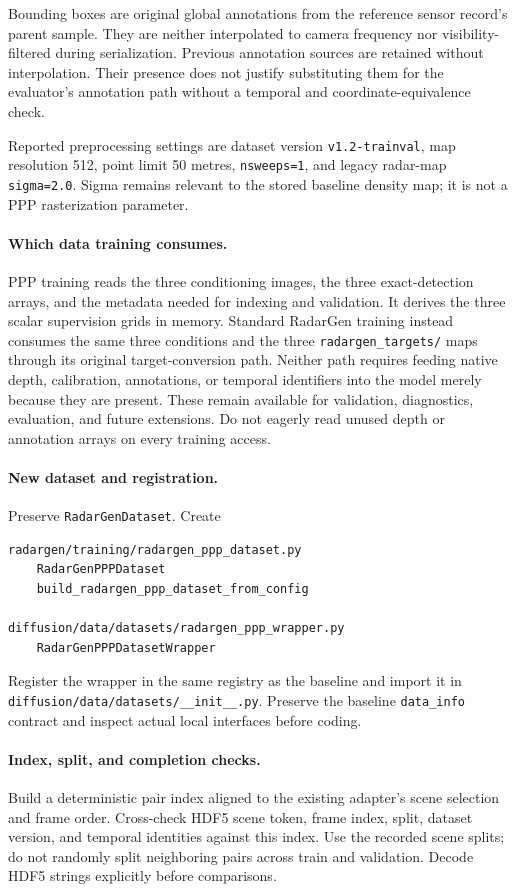 \documentclass[11pt,a4paper]{article}
\begin{document}
Bounding boxes are original global annotations from the reference sensor record's parent sample. They are neither interpolated to camera frequency nor visibility-filtered during serialization. Previous annotation sources are retained without interpolation. Their presence does not justify substituting them for the evaluator's annotation path without a temporal and coordinate-equivalence check.

Reported preprocessing settings are dataset version \texttt{v1.2-trainval}, map resolution 512, point limit 50 metres, \texttt{nsweeps=1}, and legacy radar-map \texttt{sigma=2.0}. Sigma remains relevant to the stored baseline density map; it is not a PPP rasterization parameter.

\paragraph{Which data training consumes.}
PPP training reads the three conditioning images, the three exact-detection arrays, and the metadata needed for indexing and validation. It derives the three scalar supervision grids in memory. Standard RadarGen training instead consumes the same three conditions and the three \texttt{radargen\_targets/} maps through its original target-conversion path. Neither path requires feeding native depth, calibration, annotations, or temporal identifiers into the model merely because they are present. These remain available for validation, diagnostics, evaluation, and future extensions. Do not eagerly read unused depth or annotation arrays on every training access.

\paragraph{New dataset and registration.}
Preserve \texttt{RadarGenDataset}. Create
\begin{lstlisting}
radargen/training/radargen_ppp_dataset.py
    RadarGenPPPDataset
    build_radargen_ppp_dataset_from_config

diffusion/data/datasets/radargen_ppp_wrapper.py
    RadarGenPPPDatasetWrapper
\end{lstlisting}
Register the wrapper in the same registry as the baseline and import it in \texttt{diffusion/data/datasets/\_\_init\_\_.py}. Preserve the baseline \texttt{data\_info} contract and inspect actual local interfaces before coding.

\paragraph{Index, split, and completion checks.}
Build a deterministic pair index aligned to the existing adapter's scene selection and frame order. Cross-check HDF5 scene token, frame index, split, dataset version, and temporal identities against this index. Use the recorded scene splits; do not randomly split neighboring pairs across train and validation. Decode HDF5 strings explicitly before comparisons.
\end{document}
